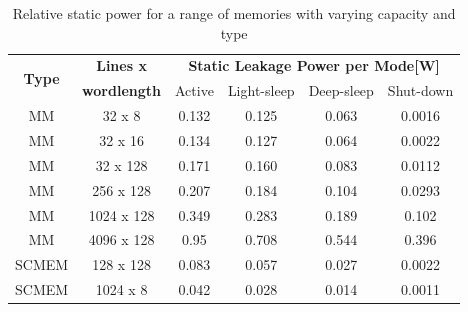 \documentclass[smallcondensed]{svjour3}
\begin{document}
\begin{table}
	\caption{Relative static power for a range of memories with varying capacity and type}
	\label{tab:rel2}
	\begin{tabular}{|c|c|c|c|c|c|}
		\hline
		\multirow{2}{*}{\textbf{Type}} & \textbf{Lines x} & \multicolumn{4}{c|}{\textbf{Static Leakage Power per Mode[W]}} \\ \cline{3-6}
		& \textbf{wordlength} & Active & Light-sleep & Deep-sleep & Shut-down\\ 
		\hline 
		MM & 32 x 8 & 0.132 & 0.125 & 0.063 & 0.0016\\ 
		\hline
		MM & 32 x 16 & 0.134 & 0.127 & 0.064 & 0.0022\\ 
		\hline
		MM & 32 x 128 & 0.171 & 0.160 & 0.083 & 0.0112\\ 
		\hline
		MM & 256 x 128 & 0.207 & 0.184 & 0.104 & 0.0293\\ 
		\hline
		MM & 1024 x 128 & 0.349 & 0.283 & 0.189 & 0.102\\ 
		\hline
		MM & 4096 x 128 & 0.95 & 0.708 & 0.544 & 0.396\\ 
		\hline
		SCMEM & 128 x 128 & 0.083 & 0.057 & 0.027 & 0.0022\\ 
		\hline
		SCMEM & 1024 x 8 & 0.042 &
		 0.028 & 0.014 & 0.0011\\ 
		\hline
	\end{tabular}
\end{table}
\end{document}

